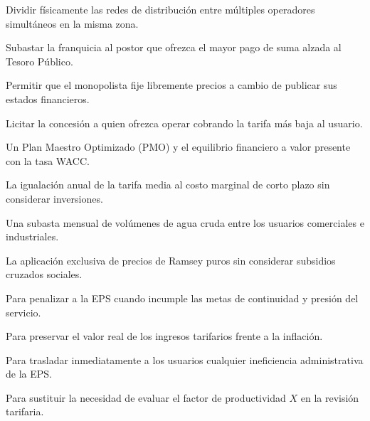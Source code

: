 \begin{opts}
    \item Dividir físicamente las redes de distribución entre múltiples operadores simultáneos en la misma zona.
    \item Subastar la franquicia al postor que ofrezca el mayor pago de suma alzada al Tesoro Público.
    \item Permitir que el monopolista fije libremente precios a cambio de publicar sus estados financieros.
    \item Licitar la concesión a quien ofrezca operar cobrando la tarifa más baja al usuario.
\end{opts}

\begin{opts}
    \item Un Plan Maestro Optimizado (PMO) y el equilibrio financiero a valor presente con la tasa WACC.
    \item La igualación anual de la tarifa media al costo marginal de corto plazo sin considerar inversiones.
    \item Una subasta mensual de volúmenes de agua cruda entre los usuarios comerciales e industriales.
    \item La aplicación exclusiva de precios de Ramsey puros sin considerar subsidios cruzados sociales.
\end{opts}

\begin{opts}
    \item Para penalizar a la EPS cuando incumple las metas de continuidad y presión del servicio.
    \item Para preservar el valor real de los ingresos tarifarios frente a la inflación.
    \item Para trasladar inmediatamente a los usuarios cualquier ineficiencia administrativa de la EPS.
    \item Para sustituir la necesidad de evaluar el factor de productividad $X$ en la revisión tarifaria.
\end{opts}

